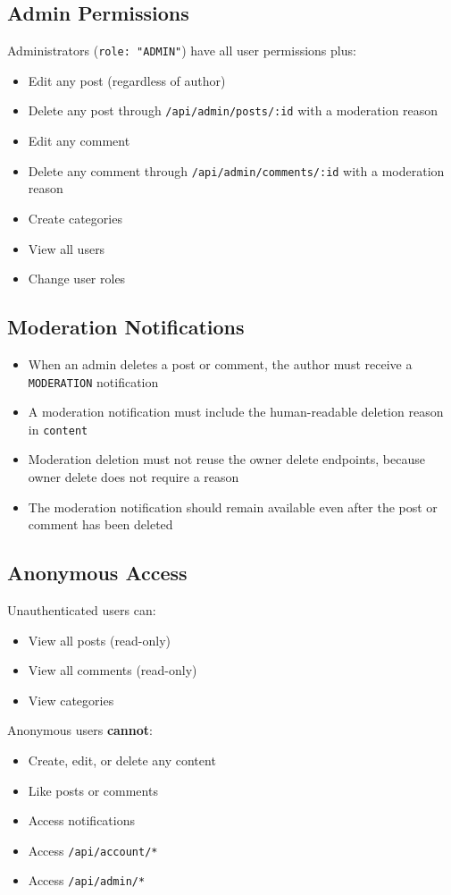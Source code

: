 \documentclass[11pt,a4paper]{article}
\begin{document}
\subsection{Admin Permissions}
Administrators (\texttt{role: "ADMIN"}) have all user permissions plus:
\begin{itemize}
    \item Edit any post (regardless of author)
    \item Delete any post through \texttt{/api/admin/posts/:id} with a moderation reason
    \item Edit any comment
    \item Delete any comment through \texttt{/api/admin/comments/:id} with a moderation reason
    \item Create categories
    \item View all users
    \item Change user roles
\end{itemize}

\subsection{Moderation Notifications}
\begin{itemize}
    \item When an admin deletes a post or comment, the author must receive a \texttt{MODERATION} notification
    \item A moderation notification must include the human-readable deletion reason in \texttt{content}
    \item Moderation deletion must not reuse the owner delete endpoints, because owner delete does not require a reason
    \item The moderation notification should remain available even after the post or comment has been deleted
\end{itemize}

\subsection{Anonymous Access}
Unauthenticated users can:
\begin{itemize}
    \item View all posts (read-only)
    \item View all comments (read-only)
    \item View categories
\end{itemize}

Anonymous users \textbf{cannot}:
\begin{itemize}
    \item Create, edit, or delete any content
    \item Like posts or comments
    \item Access notifications
    \item Access \texttt{/api/account/*}
    \item Access \texttt{/api/admin/*}
\end{itemize}
\end{document}
